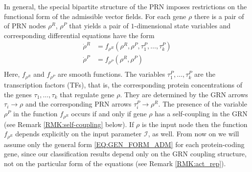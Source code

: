 \documentclass[a4paper,fleqn]{cas-dc}
\newcommand{\II}{{\mathcal I}}
\newcommand{\END}{\hfill\mbox{\raggedright \mbox{\raisebox{2pt}{\scalebox{0.6}{$\Diamond$}}}}\medskip}
\newcommand{\flatrightarrow}{\raisebox{-.2ex}{\mbox{\;\rotatebox{90}{\scalebox{1}[1.2]{$\bot$}}}\;\;}}
\begin{document}
In general, the special bipartite structure of the PRN imposes restrictions on the functional form of the admissible vector fields.
For each gene $\rho$ there is a pair of 
of PRN nodes $\rho^R$, $\rho^P$ that yields a pair of $1$-dimensional state variables and corresponding differential equations have the form
\begin{equation} \label{EQ:GEN_FORM_ADM}
\begin{split}
\dot{\rho}^R & = f_{\rho^R}(\rho^R,\rho^P,\tau^P_1,\ldots,\tau^P_k) \\
\dot{\rho}^P & = f_{\rho^P}(\rho^R, \rho^P) \\
\end{split}    
\end{equation}
Here, $f_{\rho^R}$ and $f_{\rho^P}$ are smooth functions.
The variables $\tau^P_1,\ldots,\tau^P_k$ are the transcription factors (TFs), that is, the corresponding protein concentrations of the genes $\tau_1,\ldots,\tau_k$ that regulate gene $\rho$.
They are determined by the GRN arrows $\tau_i\to\rho$ and the corresponding PRN arrows $\tau^P_i\to\rho^R$.
The presence of the variable $\rho^P$ in the function $f_{\rho^R}$ occurs if and only if gene $\rho$ has a self-coupling in the GRN (see Remark \ref{RMK:self-coupling} below).
If $\rho$ is the input node then the function $f_{\rho^R}$ depends explicitly on the input parameter $\II$, as well.
From now on we will assume only the general form \eqref{EQ:GEN_FORM_ADM} for each protein-coding gene, since our classification results depend only on the GRN coupling structure, not on the particular form of the equations (see Remark \ref{RMK:act_rep}).

\end{document}
